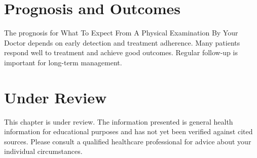 \section*{Prognosis and Outcomes}
The prognosis for What To Expect From A Physical Examination By Your Doctor depends on early detection and treatment adherence. Many patients respond well to treatment and achieve good outcomes. Regular follow-up is important for long-term management.
\section*{Under Review}
This chapter is under review. The information presented is general health information for educational purposes and has not yet been verified against cited sources. Please consult a qualified healthcare professional for advice about your individual circumstances.


\clearpage

